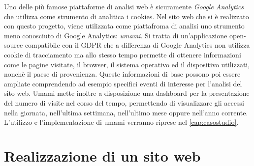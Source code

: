 \documentclass[target=bach,aauheader=]{thud}
\begin{document}
Uno delle più famose piattaforme di analisi web è sicuramente \textit{Google Analytics} che utilizza come strumento di analitica i cookies. 
Nel sito web che si è realizzato con questo progetto, viene utilizzata come piattafroma di analisi uno strumento meno conosciuto di Google Analytics: \textit{umami}. 
Si tratta di un'applicazione open-source compatibile con il GDPR che a differenza di Google Analytics non utilizza cookie di tracciamento ma allo stesso tempo permette di ottenere informazioni come le pagine visitate, il browser, il sistema operativo ed il dispositivo utilizzati, nonchè il paese di provenienza. Queste informazioni di base possono poi essere ampliate comprendendo ad esempio specifici eventi di interesse per l'analisi del sito web.
Umami mette inoltre a disposizione una dashboard per la presentazione del numero di visite nel corso del tempo, permettendo di visualizzare gli accessi nella giornata, nell'ultima settimana, nell'ultimo mese oppure nell'anno corrente. 
\newline 
L'utilizzo e l'implementazione di umami verranno riprese nel \cref{cap:casostudio}.


\chapter{Realizzazione di un sito web}

\end{document}
